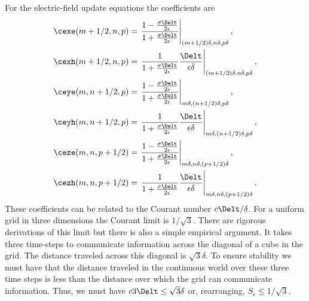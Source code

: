 For the electric-field update equations the coefficients are
\begin{align}
\cexe(m+1/2,n,p) &=
  \left.
    \frac{1-\frac{\sigma\Delt}{2\epsilon}}{1+\frac{\sigma\Delt}{2\epsilon}}
  \right|_{(m+1/2)\delta,n\delta,p\delta}, 
  \label{eq:cexeDef}
\\
\cexh(m+1/2,n,p) &=
  \left.
    \frac{1}{1+\frac{\sigma\Delt}{2\epsilon}}\frac{\Delt}{\epsilon\delta}
  \right|_{(m+1/2)\delta,n\delta,p\delta}, \\
\ceye(m,n+1/2,p) &= 
  \left.
  \frac{1-\frac{\sigma\Delt}{2\epsilon}}{1+\frac{\sigma\Delt}{2\epsilon}}
  \right|_{m\delta,(n+1/2)\delta,p\delta}, 
  \label{eq:ceyeDef}
\\
\ceyh(m,n+1/2,p) &= 
  \left.
  \frac{1}{1+\frac{\sigma\Delt}{2\epsilon}}
    \frac{\Delt}{\epsilon\delta}
  \right|_{m\delta,(n+1/2)\delta,p\delta},\\
\ceze(m,n,p+1/2) &=
  \left.
  \frac{1-\frac{\sigma\Delt}{2\epsilon}}{1+\frac{\sigma\Delt}{2\epsilon}}
  \right|_{m\delta,n\delta,(p+1/2)\delta}, 
  \label{eq:cezeDef}
\\
\cezh(m,n,p+1/2) &=
  \left.
  \frac{1}{1+\frac{\sigma\Delt}{2\epsilon}}
    \frac{\Delt}{\epsilon\delta}
  \right|_{m\delta,n\delta,(p+1/2)\delta}.
\end{align}
These coefficients can be related to the Courant number
$c\Delt/\delta$.  For a uniform grid in three dimensions the Courant
limit is $1/\sqrt{3}$.  There are rigorous derivations of this limit
but there is also a simple empirical argument.  It takes three
time-steps to communicate information across the diagonal of a cube in
the grid.  The distance traveled across this diagonal is
$\sqrt{3}\delta$.  To ensure stability we must have that the distance
traveled in the continuous world over these three time steps is less
than the distance over which the grid can communicate information.
Thus, we must have $c3\Delt\leq \sqrt{3}\delta$ or, rearranging,
$S_c\leq 1/\sqrt{3}$.

